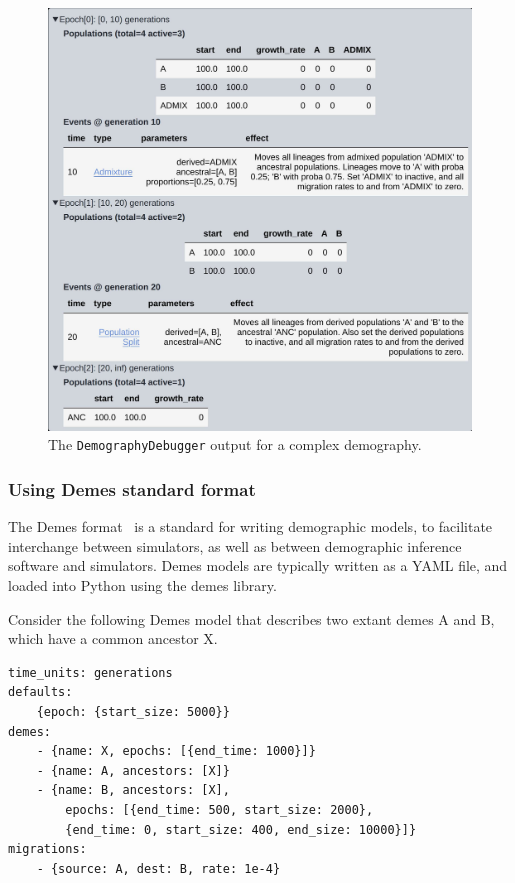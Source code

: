 \documentclass[graybox]{svmult}
\begin{document}
\begin{figure}[t]
\centering
\includegraphics[width=\textwidth]{images/demography_debugger.pdf}
\caption{\label{fig:DemographyDebugger}The \texttt{DemographyDebugger} output for a complex demography.}
\end{figure}

\subsubsection{Using Demes standard format}\label{using-demes-standard-format}

The Demes format~\citep{gower_demes_2022} is a standard for writing
demographic models, to facilitate interchange between simulators, as well as between
demographic inference software and simulators. Demes models are typically written as a
YAML file, and loaded into Python using the demes library.

Consider the following Demes model that describes two extant demes A and B, which
have a common ancestor X.

\begin{footnotesize}
\begin{verbatim}
time_units: generations
defaults:
    {epoch: {start_size: 5000}}
demes:
    - {name: X, epochs: [{end_time: 1000}]}
    - {name: A, ancestors: [X]}
    - {name: B, ancestors: [X],
        epochs: [{end_time: 500, start_size: 2000},
        {end_time: 0, start_size: 400, end_size: 10000}]}
migrations:
    - {source: A, dest: B, rate: 1e-4}

\end{verbatim}
\end{footnotesize}
\end{document}
